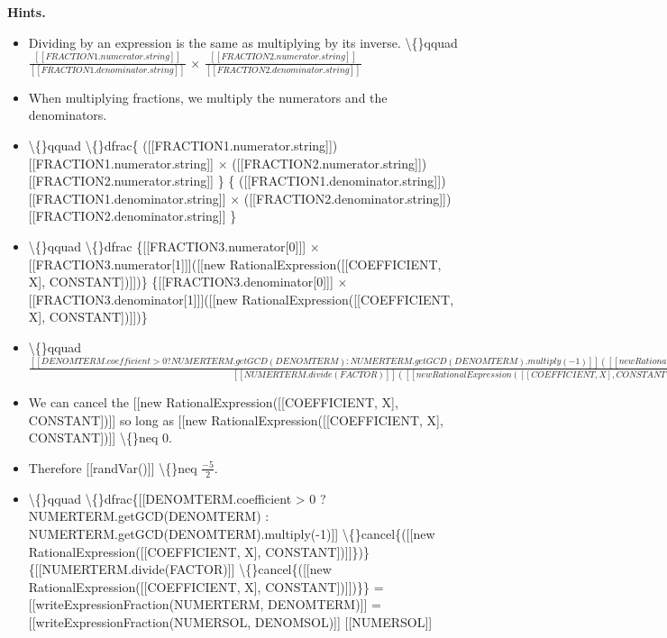 \documentclass{article}
\begin{document}
\textbf{Hints.}
\begin{itemize}
  \item Dividing by an expression is the same as multiplying by its inverse.
                        \textbackslash\{\}qquad
                            $\frac{[[FRACTION1.numerator.string]]}{[[FRACTION1.denominator.string]]}$ $\times$
                            $\frac{[[FRACTION2.numerator.string]]}{[[FRACTION2.denominator.string]]}$
  \item When multiplying fractions, we multiply the numerators and the denominators.
  \item \textbackslash\{\}qquad \textbackslash\{\}dfrac\{
                ([[FRACTION1.numerator.string]])
                [[FRACTION1.numerator.string]] $\times$
                ([[FRACTION2.numerator.string]])
                [[FRACTION2.numerator.string]] \} \{
                ([[FRACTION1.denominator.string]])
                [[FRACTION1.denominator.string]] $\times$
                ([[FRACTION2.denominator.string]])
                [[FRACTION2.denominator.string]] \}
  \item \textbackslash\{\}qquad \textbackslash\{\}dfrac
                    \{[[FRACTION3.numerator[0]]]
                     $\times$ [[FRACTION3.numerator[1]]]([[new RationalExpression([[COEFFICIENT, X], CONSTANT])]])\}
                    \{[[FRACTION3.denominator[0]]]
                     $\times$ [[FRACTION3.denominator[1]]]([[new RationalExpression([[COEFFICIENT, X], CONSTANT])]])\}
  \item \textbackslash\{\}qquad $\frac{[[DENOMTERM.coefficient > 0 ?
                NUMERTERM.getGCD(DENOMTERM) :
                NUMERTERM.getGCD(DENOMTERM).multiply(-1)]]([[new RationalExpression([[COEFFICIENT, X], CONSTANT])]])}{[[NUMERTERM.divide(FACTOR)]]([[new RationalExpression([[COEFFICIENT, X], CONSTANT])]])}$
  \item We can cancel the [[new RationalExpression([[COEFFICIENT, X], CONSTANT])]] so long as [[new RationalExpression([[COEFFICIENT, X], CONSTANT])]] \textbackslash\{\}neq 0.
  \item Therefore [[randVar()]] \textbackslash\{\}neq $\frac{-5}{2}$.
  \item \textbackslash\{\}qquad
                \textbackslash\{\}dfrac\{[[DENOMTERM.coefficient > 0 ?
                NUMERTERM.getGCD(DENOMTERM) :
                NUMERTERM.getGCD(DENOMTERM).multiply(-1)]] \textbackslash\{\}cancel\{([[new RationalExpression([[COEFFICIENT, X], CONSTANT])]]\})\}\{[[NUMERTERM.divide(FACTOR)]] \textbackslash\{\}cancel\{([[new RationalExpression([[COEFFICIENT, X], CONSTANT])]])\}\}
                = [[writeExpressionFraction(NUMERTERM, DENOMTERM)]]
                =
                    [[writeExpressionFraction(NUMERSOL, DENOMSOL)]]
                    [[NUMERSOL]]
\end{itemize}
\end{document}
